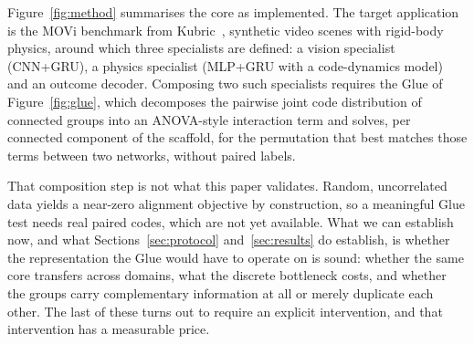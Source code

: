 \documentclass[conference]{IEEEtran}
\begin{document}
Figure~\ref{fig:method} summarises the core as implemented. The target
application is the MOVi benchmark from Kubric~\cite{greff2022kubric}, synthetic
video scenes with rigid-body physics, around which three specialists are
defined: a vision specialist (CNN+GRU), a physics specialist (MLP+GRU with a
code-dynamics model) and an outcome decoder. Composing two such specialists
requires the Glue of Figure~\ref{fig:glue}, which decomposes the pairwise joint
code distribution of connected groups into an ANOVA-style interaction term and
solves, per connected component of the scaffold, for the permutation that best
matches those terms between two networks, without paired labels.

That composition step is not what this paper validates. Random, uncorrelated
data yields a near-zero alignment objective by construction, so a meaningful
Glue test needs real paired codes, which are not yet available. What we can
establish now, and what Sections~\ref{sec:protocol} and~\ref{sec:results} do
establish, is whether the representation the Glue would have to operate on is
sound: whether the same core transfers across domains, what the discrete
bottleneck costs, and whether the groups carry complementary information at all
or merely duplicate each other. The last of these turns out to require an
explicit intervention, and that intervention has a measurable price.
\end{document}
